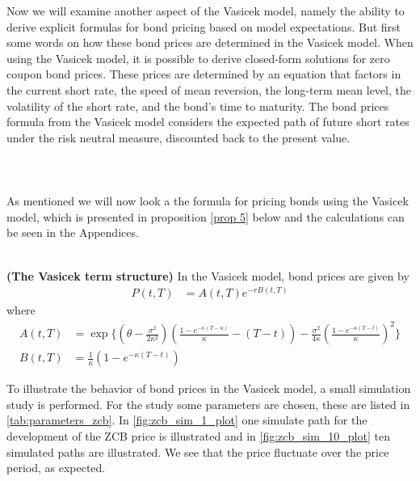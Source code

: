 Now we will examine another aspect of the Vasicek model, namely the ability to derive explicit formulas
for bond pricing based on model expectations.
But first some words on how these bond prices are determined in the Vasicek model. 
When using the Vasicek model, it is possible to derive closed-form solutions for zero coupon bond prices. 
These prices are determined by an equation that factors in the current short rate, the speed of mean reversion,
the long-term mean level, the volatility of the short rate, and the bond’s time to maturity.
The bond prices formula from the Vasicek model considers the expected path of future short 
rates under the risk neutral measure, discounted back to the present value. 
\\\\
\\\\
As mentioned we will now look a the formula for pricing bonds using the Vasicek model,
which is presented in proposition \ref{prop 5} below and the calculations can be seen in the Appendices.
\\\\
\begin{proposition}
    \label{prop 5}
    \textbf{(The Vasicek term structure)} In the Vasicek model, bond prices are given by
 \begin{align*}
    P(t,T) &= A(t,T) e^{-rB(t,T)} 
\end{align*}
where
\begin{align*}
    A(t,T)&= \exp \Biggl\{\left(\theta-\frac{\sigma^2}{2 \kappa^2}\right)\left(\frac{1-e^{-\kappa(T-u)}}{\kappa}-(T-t)\right)
    -\frac{\sigma^2}{4 \kappa}\left(\frac{1-e^{-\kappa(T-t)}}{\kappa}\right)^2 \Biggr\} \\
    B(t,T) & =\frac{1}{\kappa} \left( 1 - e^{-\kappa (T-t)} \right)  
\end{align*}
\cite{Bjork}
\end{proposition}
\noindent
To illustrate the behavior of bond prices in the Vasicek model, a small simulation study is performed. For the study 
some parameters are chosen, these are listed in \autoref{tab:parameters_zcb}. In \autoref{fig:zcb_sim_1_plot} one simulate
path for the development of the ZCB price is illustrated and in \autoref{fig:zcb_sim_10_plot} ten simulated paths are illustrated.
We see that the price fluctuate over the price period, as expected.
\\
